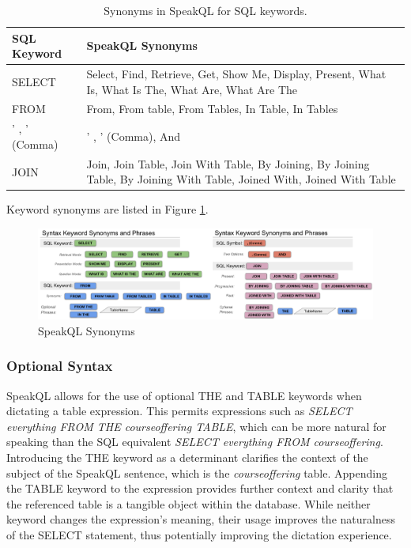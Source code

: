 \begin{table}
  \centering
  \caption{Synonyms in SpeakQL for SQL keywords.}
  \begin{tabular}{|m{6em} m{18em}|}
    \hline
    \textbf{SQL Keyword} & \textbf{SpeakQL Synonyms} \\
    \hline
    SELECT & Select, Find, Retrieve, Get, Show Me, Display, Present, What Is, What Is The, What Are, What Are The \\
    \hline
    FROM & From, From table, From Tables, In Table, In Tables \\
    \hline
    ' , ' (Comma) & ' , ' (Comma), And \\
    \hline
    JOIN & Join, Join Table, Join With Table, By Joining, By Joining Table, By Joining With Table, Joined With, Joined With Table \\
    \hline
  \end{tabular}
  \label{tab:keyword-synonyms}
\end{table}

Keyword synonyms are listed in Figure \ref{fig:synonymsslide}.

\begin{figure}
\centering
\includegraphics[width=\textwidth]{figures/all_synonyms.png}
\caption{SpeakQL Synonyms}
\label{fig:synonymsslide}
\end{figure}

\subsubsection{\textbf{Optional Syntax}} 
SpeakQL allows for the use of optional THE and TABLE keywords when dictating a table expression. 
This permits expressions such as \emph{SELECT everything FROM THE courseoffering TABLE}, which can be more natural for speaking than the SQL equivalent \emph{SELECT everything FROM courseoffering}. 
Introducing the THE keyword as a determinant clarifies the context of the subject of the SpeakQL sentence, which is the \emph{courseoffering} table. 
Appending the TABLE keyword to the expression provides further context and clarity that the referenced table is a tangible object within the database. While neither keyword changes the expression's meaning, their usage improves the naturalness of the SELECT statement, thus potentially improving the dictation experience.


